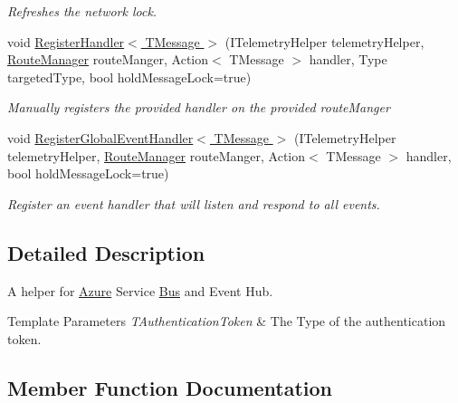\begin{DoxyCompactItemize}
\begin{DoxyCompactList}\small\item\em Refreshes the network lock. \end{DoxyCompactList}\item 
void \hyperlink{interfaceCqrs_1_1Azure_1_1ServiceBus_1_1IAzureBusHelper_a1fe0ff74b4e5cce3d0b5a81dbaa273e0_a1fe0ff74b4e5cce3d0b5a81dbaa273e0}{Register\+Handler$<$ T\+Message $>$} (I\+Telemetry\+Helper telemetry\+Helper, \hyperlink{classCqrs_1_1Bus_1_1RouteManager}{Route\+Manager} route\+Manger, Action$<$ T\+Message $>$ handler, Type targeted\+Type, bool hold\+Message\+Lock=true)
\begin{DoxyCompactList}\small\item\em Manually registers the provided {\itshape handler}  on the provided {\itshape route\+Manger}  \end{DoxyCompactList}\item 
void \hyperlink{interfaceCqrs_1_1Azure_1_1ServiceBus_1_1IAzureBusHelper_aef39e7d297ccaa36b02ccc3012dc5906_aef39e7d297ccaa36b02ccc3012dc5906}{Register\+Global\+Event\+Handler$<$ T\+Message $>$} (I\+Telemetry\+Helper telemetry\+Helper, \hyperlink{classCqrs_1_1Bus_1_1RouteManager}{Route\+Manager} route\+Manger, Action$<$ T\+Message $>$ handler, bool hold\+Message\+Lock=true)
\begin{DoxyCompactList}\small\item\em Register an event handler that will listen and respond to all events. \end{DoxyCompactList}\end{DoxyCompactItemize}


\subsection{Detailed Description}
A helper for \hyperlink{namespaceCqrs_1_1Azure}{Azure} Service \hyperlink{namespaceCqrs_1_1Bus}{Bus} and Event Hub. 


\begin{DoxyTemplParams}{Template Parameters}
{\em T\+Authentication\+Token} & The Type of the authentication token.\\
\hline
\end{DoxyTemplParams}


\subsection{Member Function Documentation}
\mbox{\label{interfaceCqrs_1_1Azure_1_1ServiceBus_1_1IAzureBusHelper_a3c632e92e0e38110f9e7721fb31700d1_a3c632e92e0e38110f9e7721fb31700d1}} 
